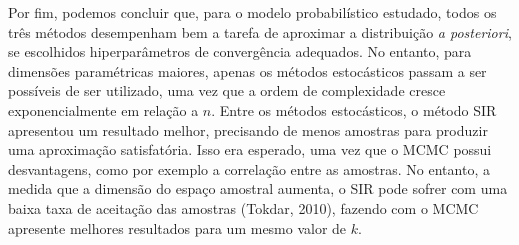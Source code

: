 Por fim, podemos concluir que, para o modelo probabilístico estudado, todos os três métodos desempenham bem a tarefa de aproximar a distribuição \textit{a posteriori}, se escolhidos hiperparâmetros de convergência adequados. No entanto, para dimensões paramétricas maiores, apenas os métodos estocásticos passam a ser possíveis de ser utilizado, uma vez que a ordem de complexidade cresce exponencialmente em relação a $n$. Entre os métodos estocásticos, o método SIR apresentou um resultado melhor, precisando de menos amostras para produzir uma aproximação satisfatória. Isso era esperado, uma vez que o MCMC possui desvantagens, como por exemplo a correlação entre as amostras. No entanto, a medida que a dimensão do espaço amostral aumenta, o SIR pode sofrer com uma baixa taxa de aceitação das amostras (Tokdar, 2010)\cite{Tokdar2010}, fazendo com o MCMC apresente melhores resultados para um mesmo valor de $k$. 